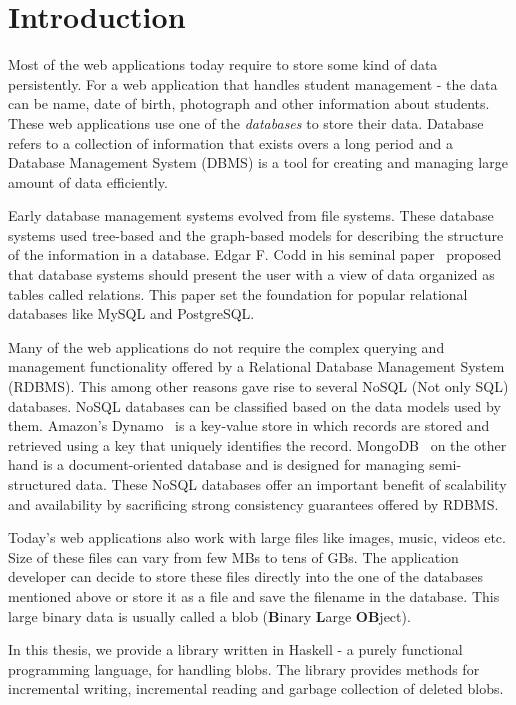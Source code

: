\chapter{Introduction}
\label{chap:intro}

Most of the web applications today require to store some kind of data persistently. For a web application that handles student management - the data can be name, date of birth, photograph and other information about students. These web applications use one of the \textit{databases} to store their data. Database refers to a collection of information that exists overs a long period and a Database Management System (DBMS) is a tool for creating and managing large amount of data efficiently.

Early database management systems evolved from file systems. These database systems used tree-based and the graph-based models for describing the structure of the information in a database. Edgar F. Codd in his seminal paper~\cite{codd1970relational} proposed that database systems should present the user with a view of data organized as tables called relations. This paper set the foundation for popular relational databases like MySQL and PostgreSQL.

Many of the web applications do not require the complex querying and management functionality offered by a Relational Database Management System (RDBMS). This among other reasons gave rise to several NoSQL (Not only SQL) databases. NoSQL databases can be classified based on the data models used by them. Amazon's Dynamo~\cite{decandia2007dynamo} is a key-value store in which records are stored and retrieved using a key that uniquely identifies the record.
MongoDB~\cite{chodorow2013mongodb} on the other hand is a document-oriented database and is designed for managing semi-structured data. These NoSQL databases offer an important benefit of scalability and availability by sacrificing strong consistency guarantees offered by RDBMS.

Today's web applications also work with large files like images, music, videos etc. Size of these files can vary from few MBs to tens of GBs. The application developer can decide to store these files directly into the one of the databases mentioned above or store it as a file and save the filename in the database. This large binary data is usually called a blob (\textbf{B}inary \textbf{L}arge \textbf{OB}ject).

In this thesis, we provide a library written in Haskell - a purely functional programming language, for handling blobs. The library provides methods for incremental writing, incremental reading and garbage collection of deleted blobs.

